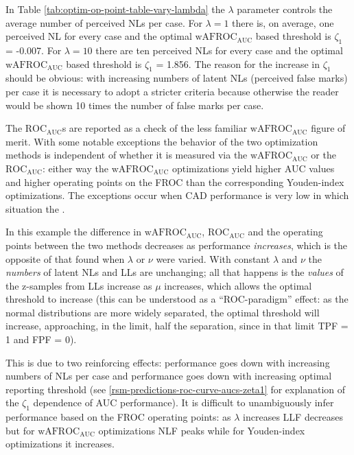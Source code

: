 \documentclass[
]{book}
\begin{document}
In Table \ref{tab:optim-op-point-table-vary-lambda} the \(\lambda\) parameter controls the average number of perceived NLs per case. For \(\lambda = 1\) there is, on average, one perceived NL for every case and the optimal \(\text{wAFROC}_\text{AUC}\) based threshold is \(\zeta_1\) = -0.007. For \(\lambda = 10\) there are ten perceived NLs for every case and the optimal \(\text{wAFROC}_\text{AUC}\) based threshold is \(\zeta_1\) = 1.856. The reason for the increase in \(\zeta_1\) should be obvious: with increasing numbers of latent NLs (perceived false marks) per case it is necessary to adopt a stricter criteria because otherwise the reader would be shown 10 times the number of false marks per case.

The \(\text{ROC}_\text{AUC}\)s are reported as a check of the less familiar \(\text{wAFROC}_\text{AUC}\) figure of merit. With some notable exceptions the behavior of the two optimization methods is independent of whether it is measured via the \(\text{wAFROC}_\text{AUC}\) or the \(\text{ROC}_\text{AUC}\): either way the \(\text{wAFROC}_\text{AUC}\) optimizations yield higher AUC values and higher operating points on the FROC than the corresponding Youden-index optimizations. The exceptions occur when CAD performance is very low in which situation the .

In this example the difference in \(\text{wAFROC}_\text{AUC}\), \(\text{ROC}_\text{AUC}\) and the operating points between the two methods decreases as performance \emph{increases}, which is the opposite of that found when \(\lambda\) or \(\nu\) were varied. With constant \(\lambda\) and \(\nu\) the \emph{numbers} of latent NLs and LLs are unchanging; all that happens is the \emph{values} of the z-samples from LLs increase as \(\mu\) increases, which allows the optimal threshold to increase (this can be understood as a ``ROC-paradigm'' effect: as the normal distributions are more widely separated, the optimal threshold will increase, approaching, in the limit, half the separation, since in that limit TPF = 1 and FPF = 0).

This is due to two reinforcing effects: performance goes down with increasing numbers of NLs per case and performance goes down with increasing optimal reporting threshold (see \ref{rsm-predictions-roc-curve-aucs-zeta1} for explanation of the \(\zeta_1\) dependence of AUC performance). It is difficult to unambiguously infer performance based on the FROC operating points: as \(\lambda\) increases LLF decreases but for \(\text{wAFROC}_\text{AUC}\) optimizations NLF peaks while for Youden-index optimizations it increases.
\end{document}
